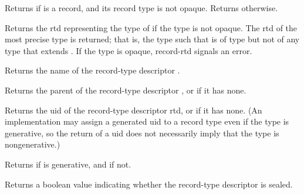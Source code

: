 \begin{entry}{%
}
   
Returns \schtrue{} if  is a record, and its record type is
not opaque. Returns \schfalse{} otherwise.
\end{entry}

\begin{entry}{%
}
   
Returns the rtd representing the type of  if the type is not
opaque. The rtd of the most precise type is returned; that is, the
type  such that  is of type  but not of any
type that extends .  If the type is opaque, {\cf record-rtd} signals
an error.
\end{entry}

\begin{entry}{%
}
   
Returns the name of the record-type descriptor .
\end{entry}   

\begin{entry}{%
}
   
Returns the parent of the record-type descriptor , or
\schfalse{} if it has none.
\end{entry}

\begin{entry}{%
}
   
Returns the uid of the record-type descriptor rtd, or \schfalse{} if it has none.
(An implementation may assign a generated uid to a record type even if the
type is generative, so the return of a uid does not necessarily imply that
the type is nongenerative.)
\end{entry}

\begin{entry}{%
}
   
Returns \schtrue{} if  is generative, and \schfalse{} if not.
\end{entry}

\begin{entry}{%
}

Returns a boolean value indicating whether the record-type descriptor is
sealed.
\end{entry}

